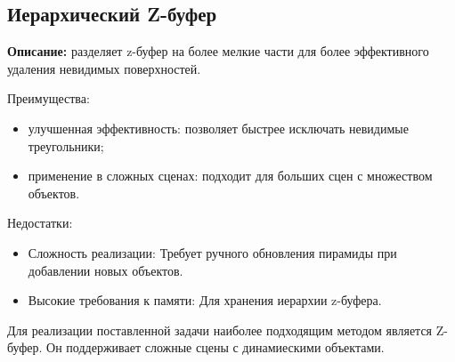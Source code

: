 \subsection{Иерархический Z-буфер}

\textbf{Описание:} разделяет z-буфер на более мелкие части для более эффективного удаления невидимых поверхностей.~\cite{lit3}

Преимущества:
\begin{itemize}
\item улучшенная эффективность: позволяет быстрее исключать невидимые треугольники;
\item применение в сложных сценах: подходит для больших сцен с множеством объектов.
\end{itemize}

Недостатки:
\begin{itemize}
\item Сложность реализации: Требует ручного обновления пирамиды при добавлении новых объектов.
\item Высокие требования к памяти: Для хранения иерархии z-буфера.
\end{itemize}

\begin{table}[H]
\small
\centering
{}
\caption{Сравнение алгоритмов удаления невидимых рёбер и поверхностей}
\label{tab:comparison}
\end{table}



Для реализации поставленной задачи наиболее подходящим методом является Z-буфер. Он поддерживает сложные сцены с динамиескими объектами.


